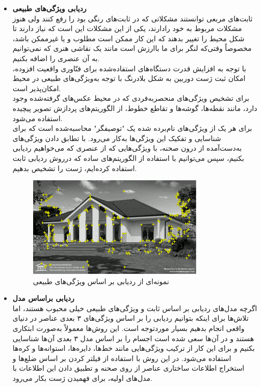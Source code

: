 \begin{itemize}
	\item \textbf{ردیابی ویژگی‌های طبیعی}
	\\
	ثابت‌های مربعی توانستند مشکلاتی که در ثابت‌های رنگی بود را رفع کنند ولی هنوز مشکلات مربوط به خود رادارند، یکی از این مشکلات این است که نیاز دارند تا شکل محیط را تغییر بدهند که این کار ممکن است مطلوب و یا غیرممکن باشد، مخصوصاً وقتی‌که لنگر برای ما باارزش است مانند یک نقاشی هنری که نمی‌توانیم به آن عنصری را اضافه بکنیم.
	\\
	با توجه به افزایش قدرت دستگاه‌های استفاده‌شده برای فنّاوری واقعیت افزوده، امکان ثبت ژست دوربین به شکل بلادرنگ با توجه به‌ویژگی‌های طبیعی در محیط امکان‌پذیر است.
	\\
	برای تشخیص ویژگی‌های منحصربه‌فردی که در محیط عکس‌های گرفته‌شده وجود دارد، مانند نقطه‌ها، گوشه‌ها و تقاطع خطوط، از الگوریتم‌های پردازش تصویر پیچیده استفاده می‌شود.
	\\
	برای هر یک از ویژگی‌های نام‌برده شده یک "توصیفگر" محاسبه‌شده است که برای شناسایی و تفکیک این ویژگی‌ها به‌کار می‌رود. با تطابق دادن ویژگی‌های به‌دست‌آمده از درون صحنه، با ویژگی‌هایی که از عنصری که می‌خواهیم ردیابی بکنیم، سپس می‌توانیم با استفاده از الگوریتم‌های ساده که درروش ردیابی ثابت استفاده کرده‌ایم، ژست را تشخیص بدهیم\cite{alahi2012freak}.
		\begin{figure}
		\centering
		\includegraphics[width=1\linewidth]{image/nft}
		\caption {نمونه‌ای از ردیابی بر اساس ویژگی‌های طبیعی   \cite{nft}}
		\label{fig:nft}
	\end{figure}
	\item \textbf{ردیابی براساس مدل}
	\\
اگرچه مدل‌های ردیابی بر اساس ثابت و ویژگی‌های طبیعی خیلی محبوب هستند، اما تلاش‌ها برای اینکه بتوانیم ردیابی را بر اساس ویژگی‌های ۳ بعدی عناصر در دنیای واقعی انجام بدهیم بسیار موردتوجه است. این روش‌ها معمولاً به‌صورت ابتکاری هستند و در آن‌ها سعی شده است اجسام را بر اساس مدل ۳ بعدی آن‌ها شناسایی بکنیم و برای این کار از ترکیب ویژگی‌هایی مانند خط‌ها، دایره‌ها، استوانه‌ها و کره‌ها استفاده می‌شود\cite{comport2003real}. در این روش با استفاده از  فیلتر کردن بر اساس ضلع‌ها و استخراج اطلاعات ساختاری عناصر از روی صحنه و تطبیق دادن این اطلاعات با مدل‌های اولیه، برای فهمیدن ژست بکار می‌رود\cite{wuest2005adaptive}.

\end{itemize}
